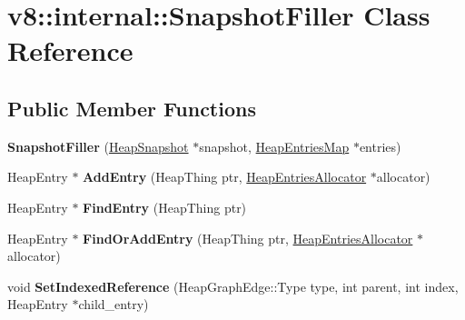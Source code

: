 \hypertarget{classv8_1_1internal_1_1_snapshot_filler}{}\section{v8\+:\+:internal\+:\+:Snapshot\+Filler Class Reference}
\label{classv8_1_1internal_1_1_snapshot_filler}
\subsection*{Public Member Functions}
\begin{DoxyCompactItemize}
\item 
{\bfseries Snapshot\+Filler} (\hyperlink{classv8_1_1internal_1_1_heap_snapshot}{Heap\+Snapshot} $\ast$snapshot, \hyperlink{classv8_1_1internal_1_1_heap_entries_map}{Heap\+Entries\+Map} $\ast$entries)\hypertarget{classv8_1_1internal_1_1_snapshot_filler_af5966d0560b75ba444ea1857103f992e}{}\label{classv8_1_1internal_1_1_snapshot_filler_af5966d0560b75ba444ea1857103f992e}

\item 
Heap\+Entry $\ast$ {\bfseries Add\+Entry} (Heap\+Thing ptr, \hyperlink{classv8_1_1internal_1_1_heap_entries_allocator}{Heap\+Entries\+Allocator} $\ast$allocator)\hypertarget{classv8_1_1internal_1_1_snapshot_filler_ab9333ca4c5639e3fc871bc4ca1f085fd}{}\label{classv8_1_1internal_1_1_snapshot_filler_ab9333ca4c5639e3fc871bc4ca1f085fd}

\item 
Heap\+Entry $\ast$ {\bfseries Find\+Entry} (Heap\+Thing ptr)\hypertarget{classv8_1_1internal_1_1_snapshot_filler_a9959816c6a13c23f167634d9d03b379f}{}\label{classv8_1_1internal_1_1_snapshot_filler_a9959816c6a13c23f167634d9d03b379f}

\item 
Heap\+Entry $\ast$ {\bfseries Find\+Or\+Add\+Entry} (Heap\+Thing ptr, \hyperlink{classv8_1_1internal_1_1_heap_entries_allocator}{Heap\+Entries\+Allocator} $\ast$allocator)\hypertarget{classv8_1_1internal_1_1_snapshot_filler_a36cffb06d22463a9f5f2302c311aecb0}{}\label{classv8_1_1internal_1_1_snapshot_filler_a36cffb06d22463a9f5f2302c311aecb0}

\item 
void {\bfseries Set\+Indexed\+Reference} (Heap\+Graph\+Edge\+::\+Type type, int parent, int index, Heap\+Entry $\ast$child\+\_\+entry)\hypertarget{classv8_1_1internal_1_1_snapshot_filler_a8fb7cc8fd0076b36d8de1db0ccbbdd72}{}\label{classv8_1_1internal_1_1_snapshot_filler_a8fb7cc8fd0076b36d8de1db0ccbbdd72}


\end{DoxyCompactItemize}
